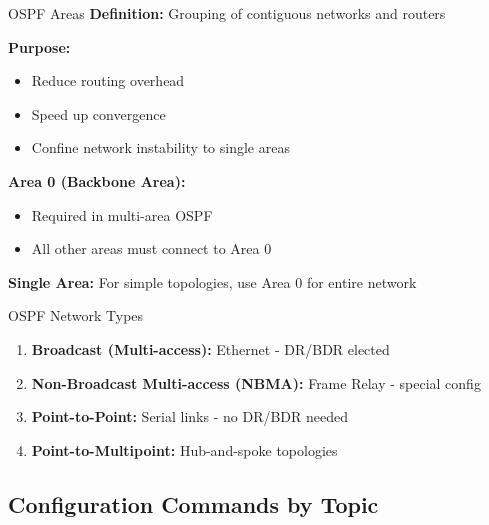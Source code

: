 \documentclass[12pt,a4paper]{article}
\begin{document}
\begin{theorybox}{OSPF Areas}
\textbf{Definition:} Grouping of contiguous networks and routers

\vspace{0.2cm}
\textbf{Purpose:}
\begin{itemize}[noitemsep]
    \item Reduce routing overhead
    \item Speed up convergence
    \item Confine network instability to single areas
\end{itemize}

\vspace{0.2cm}
\textbf{Area 0 (Backbone Area):}
\begin{itemize}[noitemsep]
    \item Required in multi-area OSPF
    \item All other areas must connect to Area 0
\end{itemize}

\vspace{0.2cm}
\textbf{Single Area:} For simple topologies, use Area 0 for entire network
\end{theorybox}

\begin{theorybox}{OSPF Network Types}
\begin{enumerate}[noitemsep]
    \item \textbf{Broadcast (Multi-access):} Ethernet - DR/BDR elected
    \item \textbf{Non-Broadcast Multi-access (NBMA):} Frame Relay - special config
    \item \textbf{Point-to-Point:} Serial links - no DR/BDR needed
    \item \textbf{Point-to-Multipoint:} Hub-and-spoke topologies
\end{enumerate}
\end{theorybox}

\subsection{Configuration Commands by Topic}
\end{document}
